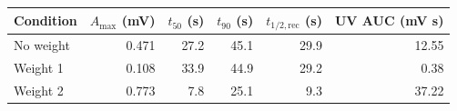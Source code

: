 \begin{tabular}{lrrrrr}
\hline
Condition & $A_{\max}$ (mV) & $t_{50}$ (s) & $t_{90}$ (s) & $t_{1/2,\mathrm{rec}}$ (s) & UV AUC (mV s)\\
\hline
No weight & 0.471 & 27.2 & 45.1 & 29.9 & 12.55\\
Weight 1 & 0.108 & 33.9 & 44.9 & 29.2 & 0.38\\
Weight 2 & 0.773 & 7.8 & 25.1 & 9.3 & 37.22\\
\hline
\end{tabular}
